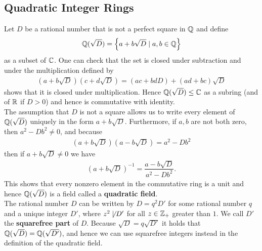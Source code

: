 \documentclass{memoir}
\begin{document}


\subsection{Quadratic Integer Rings}
\label{sub:quadratic_integer_rings}

Let \(D\) be a rational number that is not a perfect square in \(\mathbb{Q}\) and define
\begin{align*}
	\mathbb{Q}(\sqrt{D} ) = \left\{a+b\sqrt{D}  \mid a,b \in \mathbb{Q} \right\} 
\end{align*}
as a subset of \(\mathbb{C}\). One can check that the set is closed under subtraction and under the multiplication defined by
\begin{align*}
	(a+b\sqrt{D})(c+d\sqrt{D} ) = (ac+bdD) + (ad+bc)\sqrt{D} 
\end{align*}
shows that it is closed under multiplication. Hence \(\mathbb{Q}(\sqrt{D} ) \leq \mathbb{C}\) as a subring (and of \(\mathbb{R}\) if \(D>0\)) and hence is commutative with identity.\\

The assumption that \(D\) is not a square allows us to write every element of \(\mathbb{Q}(\sqrt{D} )\) uniquely in the form \(a+b\sqrt{D} \). Furthermore, if \(a,b\) are not both zero, then \(a^2-Db^2\neq 0\), and because
\begin{align*}
	(a+b\sqrt{D} )(a-b\sqrt{D} ) = a^2-Db^2
\end{align*}
then if \(a+b\sqrt{D} \neq 0\) we have
\begin{align*}
	(a+b\sqrt{D} )^{-1} = \dfrac{a-b\sqrt{D} }{a^2-Db^2}.
\end{align*}
This shows that every nonzero element in the commutative ring is a unit and hence \(\mathbb{Q}(\sqrt{D} )\) is a field called a \textbf{quadratic field}.\\

The rational number \(D\) can be written by \(D = q^2D'\) for some rational number \(q\) and a unique integer \(D'\), where \(z^2\not\mid D'\) for all \(z \in \mathbb{Z}_+\) greater than \(1\). We call \(D'\) the \textbf{squarefree part} of \(D\). Because \(\sqrt{D} =q\sqrt{D'} \) it holds that \(\mathbb{Q}(\sqrt{D} )=\mathbb{Q}(\sqrt{D'} )\), and hence we can use squarefree integers instead in the definition of the quadratic field.\\
\end{document}
